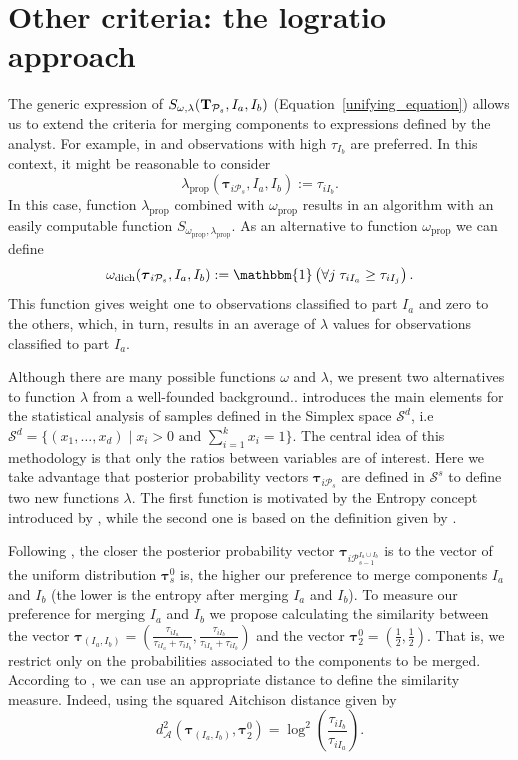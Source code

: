 \documentclass[submit]{smj}
\theoremstyle{definition}
\newcommand{\m}[1]{\boldsymbol{#1}}
\begin{document}
\section{Other criteria: the logratio approach}\label{logratio_section}


The generic expression of $S_{\omega, \lambda}(\text{\textbf{T}}_{\mathcal{P}_s},  I_a,  I_b)$ (Equation~\ref{unifying_equation}) allows us to extend the criteria for merging components to expressions defined by the analyst. For example, in \cite{hennig2010methods} and \cite{longford2014} observations with high $\tau_{I_b}$ are preferred. In this context, it might be reasonable to consider
\[
\lambda_{\text{prop}}(\m\tau_{i \mathcal{P}_s},  I_a,  I_b) := \tau_{iI_b}.
\]
In this case, function $\lambda_{\text{prop}}$ combined with $\omega_{\text{prop}}$ results in an algorithm with an easily computable function $S_{\omega_\text{prop}, \lambda_\text{prop}}$. As an alternative to function $\omega_{\text{prop}}$ we can define 
\[
\omega_{\text{dich}}(\m\tau_{i \mathcal{P}_s},  I_a,  I_b) := \mathbbm{1}\left( \forall j\; \tau_{i I_{a}} \geq \tau_{iI_j} \right).
\]
This function gives weight one to observations classified to part $I_a$ and zero to the others, which, in turn, results in an average of $\lambda$ values for observations classified to part $I_a$. 

Although there are many possible functions $\omega$ and $\lambda$, we present two alternatives to function $\lambda$ from a well-founded background.. \cite{aitchison1986statistical} introduces the main elements for the statistical analysis of samples defined in the Simplex space $\mathcal{S}^d$, i.e $\mathcal{S}^d = \{ (x_1,\dots, x_d) \;|\; x_i > 0 \text{ and } \sum_{i=1}^k x_i = 1 \}$. The central idea of this methodology is that only the ratios between variables are of interest. Here we take advantage that posterior probability vectors $\m\tau_{i\mathcal{P}_s}$ are defined in $\mathcal{S}^s$ to define two new functions $\lambda$. The first function is motivated by the Entropy concept introduced by \cite{baudry2010combining}, while the second one is based on the definition given by \cite{longford2014}.


Following \cite{baudry2010combining}, the closer the posterior probability vector $\m\tau_{i \mathcal{P}_{s-1}^{I_a\cup I_b}}$ is to the vector of the uniform distribution $\m\tau_s^0$ is, the higher our preference to merge components $I_a$ and $I_b$ (the lower is the entropy after merging $I_a$ and $I_b$). To measure our preference for merging $I_a$ and $I_b$ we propose calculating the similarity between the vector $\m\tau_{\left(I_a, I_b\right)} = (\frac{\tau_{i I_a}}{\tau_{i I_a} + \tau_{i I_b}}, \frac{\tau_{i I_b}}{\tau_{i I_a} + \tau_{i I_b}})$ and the vector $\m\tau_2^0=\left(\frac{1}{2}, \frac{1}{2}\right)$. That is, we restrict only on the probabilities associated to the components to be merged. According to \cite{frey2007}, we can use an appropriate distance to define the similarity measure. Indeed, using the squared Aitchison distance \citep{palarea2012dealing} given by
\[
d_\mathcal{A}^2\left(\m\tau_{\left(I_a, I_b\right)}, \m\tau_2^0 \right) = \log^2 \left(\frac{ \tau_{iI_b} }{ \tau_{iI_a} }\right).
\]
\end{document}
